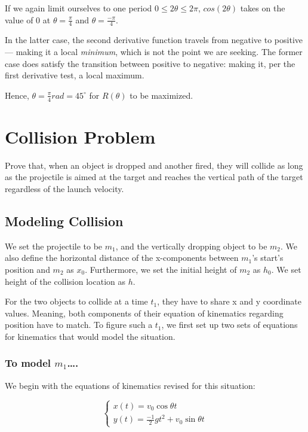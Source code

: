 \documentclass[letterpaper]{article}
\begin{document}
If we again limit ourselves to one period \(0\leq 2\theta \leq 2\pi\), \(cos(2\theta)\) takes on the value of \(0\) at \(\theta = \frac{\pi}{4}\) and \(\theta = \frac{-\pi}{4}\).

In the latter case, the second derivative function travels from negative to positive --- making it a local \emph{minimum}, which is not the point we are seeking. The former case does satisfy the transition between positive to negative: making it, per the first derivative test, a local maximum.

Hence, \(\theta=\frac{\pi}{4}rad=45^{\circ}\) for \(R(\theta)\) to be maximized.

\section{Collision Problem}
\label{sec:org3cff22d}
Prove that, when an object is dropped and another fired, they will collide as long as the projectile is aimed at the target and reaches the vertical path of the target regardless of the launch velocity.

\subsection{Modeling Collision}
\label{sec:org3819571}
We set the projectile to be \(m_1\), and the vertically dropping object to be \(m_2\). We also define the horizontal distance of the x-components between \(m_1\)'s start's position and \(m_2\) as \(x_0\). Furthermore, we set the initial height of \(m_2\) as \(h_0\). We set height of the collision location as \(h\).

For the two objects to collide at a time \(t_1\), they have to share x and y coordinate values. Meaning, both components of their equation of kinematics regarding position have to match. To figure such a \(t_1\), we first set up two sets of equations for kinematics that would model the situation.


\subsubsection{To model \(m_1\)\ldots{}.}
\label{sec:org557b59c}
We begin with the equations of kinematics revised for this situation:

\begin{equation}
    \begin{cases}
        x(t) = v_0\cos\theta t \\
        y(t) = \frac{-1}{2}g t^2 + v_0\sin\theta t
    \end{cases}
\end{equation}
\end{document}
